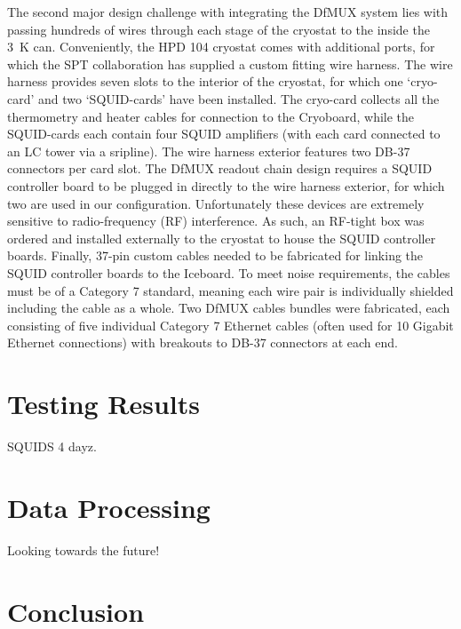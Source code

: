 \documentclass[iop]{emulateapj}
\begin{document}
The second major design challenge with integrating the DfMUX system lies with passing hundreds of wires through each stage of the cryostat to the inside the 3~K can.  Conveniently, the HPD 104 cryostat comes with additional ports, for which the SPT collaboration has supplied a custom fitting wire harness.  The wire harness provides seven slots to the interior of the cryostat, for which one `cryo-card' and two `SQUID-cards' have been installed.  The cryo-card collects all the thermometry and heater cables for connection to the Cryoboard, while the SQUID-cards each contain four SQUID amplifiers (with each card connected to an LC tower via a sripline).  The wire harness exterior features two DB-37 connectors per card slot.  The DfMUX readout chain design requires a SQUID controller board to be plugged in directly to the wire harness exterior, for which two are used in our configuration.  Unfortunately these devices are extremely sensitive to radio-frequency (RF) interference.  As such, an RF-tight box was ordered and installed externally to the cryostat to house the SQUID controller boards.  Finally, 37-pin custom cables needed to be fabricated for linking the SQUID controller boards to the Iceboard.  To meet noise requirements, the cables must be of a Category 7 standard, meaning each wire pair is individually shielded including the cable as a whole.  Two DfMUX cables bundles were fabricated, each consisting of five individual Category 7 Ethernet cables (often used for 10 Gigabit Ethernet connections) with breakouts to DB-37 connectors at each end.

\section{Testing Results}
\label{results_section}

SQUIDS 4 dayz.

\section{Data Processing}
\label{data_section}

Looking towards the future!


\section{Conclusion}
\end{document}
